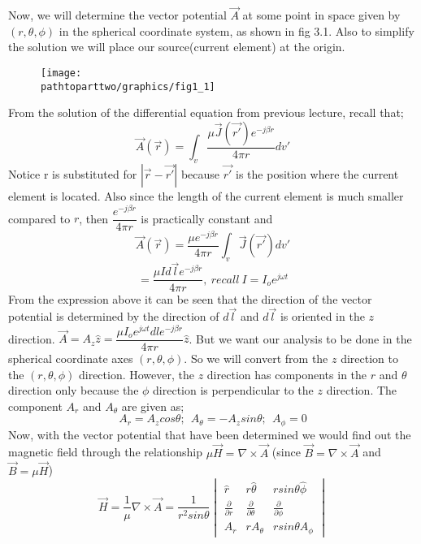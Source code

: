 Now, we will determine the vector potential $\vec{A}$ at some point in space given by $(r, \theta, \phi)$ in the spherical coordinate system, as shown in fig 3.1. Also to simplify the solution we will place our source(current element) at the origin.
\begin{figure}[h]
\texttt{[image: \\pathtoparttwo/graphics/fig1\_1]}
\centering
\caption{}
\label{fig:1}
\end{figure}\newline
From the solution of the differential equation from previous lecture, recall that;
$$ \vec{A}(\vec{r}) =\int_v \dfrac{\mu \vec{J}(\vec{r'}) e^{-j\beta r}}{4\pi r}dv'$$ 
Notice r is substituted for $|\vec{r} - \vec{r'}|$ because $\vec{r'}$ is the position where the current element is located. Also since the length of the current element is much smaller compared to $r$, then $\dfrac{e^{-j\beta r}}{4 \pi r}$ is practically constant and 
$$ \vec{A}(\vec{r}) = \dfrac{\mu e^{-j\beta r}}{4 \pi r}\int_v\vec{J}(\vec{r'})dv'$$
$$  = \dfrac{\mu I d\vec{l} e^{-j\beta r}}{4\pi r}, \ recall \ I = I_oe^{j\omega t}$$
From the expression above it can be seen that the direction of the vector potential is determined by the direction of $d\vec{l}$ and $d\vec{l}$ is oriented in the $z$ direction. $\vec{A} = A_z\hat{z} = \dfrac{\mu I_o e^{j\omega t} dl e^{-j\beta r}}{4\pi r}\hat{z}$. But we want our analysis to be done in the spherical coordinate axes $(r, \theta, \phi)$. So we will convert from the $z$ direction to the $(r, \theta, \phi)$ direction. However, the $z$ direction has components in the $r$ and $\theta$ direction only because the $\phi$ direction is perpendicular to the $z$ direction. The component $A_{r}$ and $A_{\theta}$ are given as;
$$ A_{r} = A_z cos\theta; \ \
A_{\theta} = - A_z sin\theta; \ \
A_{\phi} = 0 $$
Now, with the vector potential that have been determined we would find out the magnetic field through the relationship $\mu \vec{H} = \nabla \times \vec{A}$ (since $\vec{B} = \nabla \times \vec{A}$ and $ \vec{B} = \mu \vec{H}$)
\begin{equation*}
\vec{H} = \frac{1}{\mu} \nabla \times \vec{A} = \dfrac{1}{r^2 sin\theta}
\begin{vmatrix}
\hat{r} & r\hat{\theta} & rsin\theta\hat{\phi} \\
\frac{\partial }{\partial r} &  \frac{\partial }{\partial \theta} &  \frac{\partial }{\partial \phi} \\
A_r & rA_{\theta} & rsin\theta A_{\phi}
\end{vmatrix}
\end{equation*}
